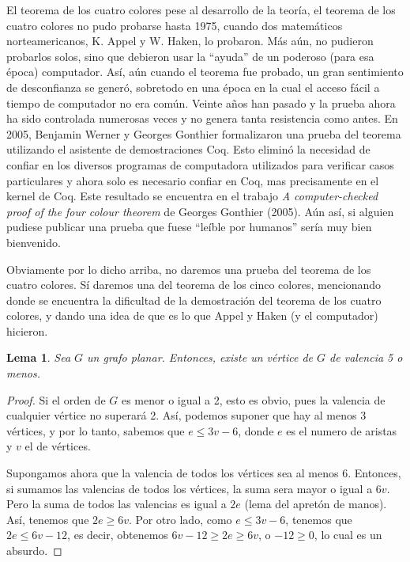 \documentclass[11pt,spanish,makeidx]{amsbook}
\newtheorem{lema}[teorema]{Lema}
\theoremstyle{definition}
\theoremstyle{remark}
\begin{document}
\begin{section}{El teorema de los cuatro colores}
pese al desarrollo de la teoría, el teorema de los cuatro colores
no pudo probarse hasta 1975, cuando dos matemáticos  norteamericanos, K. Appel y W. Haken, lo
probaron. Más aún, no pudieron probarlos solos, sino que debieron
usar la ``ayuda'' de un poderoso (para esa época) computador. Así,
aún cuando el teorema fue probado, un gran sentimiento de
desconfianza se generó, sobretodo en una época en la cual el
acceso fácil a tiempo de computador no era común. Veinte años han
pasado y la prueba ahora ha sido controlada numerosas veces y no
genera tanta resistencia como antes. En 2005, Benjamin Werner y Georges Gonthier formalizaron una prueba del teorema utilizando el asistente de demostraciones Coq. Esto eliminó la necesidad de confiar en los diversos programas de computadora utilizados para verificar casos particulares y ahora  solo es necesario confiar en Coq, mas precisamente en el kernel de Coq. Este resultado se encuentra en el trabajo \textit{A computer-checked proof of the four colour theorem} de Georges Gonthier (2005).  Aún así, si alguien pudiese
publicar una prueba que fuese ``leíble por humanos'' sería muy
bien bienvenido.

Obviamente por lo dicho arriba, no daremos una prueba del teorema
de los cuatro colores. Sí daremos una del teorema de los cinco
colores, mencionando donde se encuentra la dificultad de la demostración del teorema de los  cuatro colores, y dando una idea de
que es lo que Appel y Haken (y el computador) hicieron.

\begin{lema} \label{lA4.3.1} Sea $G$ un grafo planar. Entonces, existe
un vértice de $G$ de valencia 5 o menos.
\end{lema}
\begin{proof} Si el orden de $G$ es menor o igual a 2, esto
es obvio, pues la valencia de cualquier vértice no superará 2.
Así, podemos suponer que hay al menos 3 vértices, y por lo tanto,
sabemos que $e\le 3v-6$, donde $e$ es el numero de aristas y $v$
el de vértices.

Supongamos ahora que la valencia de todos los vértices sea al
menos 6. Entonces, si sumamos las valencias de todos los vértices,
la suma sera mayor o igual a $6v$. Pero la suma de todos las
valencias es igual a $2e$ (lema del apretón de manos). Así,
tenemos que $2e\ge 6v$. Por otro lado, como $e\le 3v-6$, tenemos
que $2e\le 6v-12$, es decir, obtenemos $6v-12\ge 2e\ge 6v$, o
$-12\ge 0$, lo cual es un absurdo.
\end{proof}


\end{section}
\end{document}
